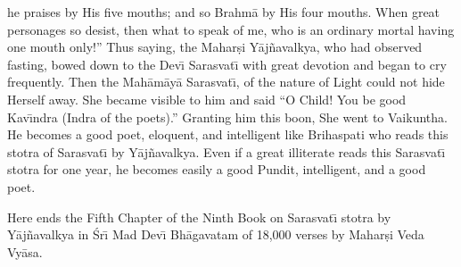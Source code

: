he praises by His five mouths; and so Brahm\=a by His four mouths. When great personages so desist, then what to speak of me, who is an ordinary mortal having one mouth only!'' Thus saying, the Mahar\d{s}i Y\=aj\~navalkya, who had observed fasting, bowed down to the Dev\={\i} Sarasvat\={\i} with great devotion and began to cry frequently. Then the Mah\=am\=ay\=a Sarasvat\={\i}, of the nature of Light could not hide Herself away. She became visible to him and said ``O Child! You be good Kav\={\i}ndra (Indra of the poets).'' Granting him this boon, She went to Vaikuntha. He becomes a good poet, eloquent, and intelligent like Brihaspati who reads this stotra of Sarasvat\={\i} by Y\=aj\~navalkya. Even if a great illiterate reads this Sarasvat\={\i} stotra for one year, he becomes easily a good Pundit, intelligent, and a good poet.

Here ends the Fifth Chapter of the Ninth Book on Sarasvat\={\i} stotra by Y\=aj\~navalkya in \'Sr\={\i} Mad Dev\={\i} Bh\=agavatam of 18,000 verses by Mahar\d{s}i Veda Vy\=asa.



